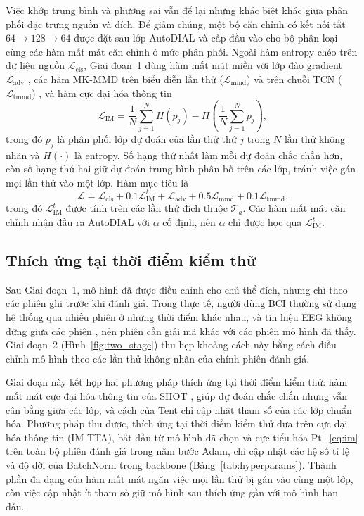 \documentclass[preprint,12pt]{elsarticle}
\begin{document}
Việc khớp trung bình và phương sai vẫn để lại những khác biệt khác giữa phân phối đặc trưng nguồn và đích. Để giảm chúng, một bộ căn chỉnh có kết nối tắt $64\!\rightarrow\!128\!\rightarrow\!64$ được đặt sau lớp AutoDIAL và cấp đầu vào cho bộ phân loại cùng các hàm mất mát căn chỉnh ở mức phân phối. Ngoài hàm entropy chéo trên dữ liệu nguồn $\mathcal{L}_{\mathrm{cls}}$, Giai đoạn~1 dùng hàm mất mát miền với lớp đảo gradient $\mathcal{L}_{\mathrm{adv}}$ \cite{ganin2016dann}, các hàm MK-MMD trên biểu diễn lần thử ($\mathcal{L}_{\mathrm{mmd}}$) và trên chuỗi TCN ($\mathcal{L}_{\mathrm{tmmd}}$) \cite{long2015dan}, và hàm cực đại hóa thông tin \cite{liang2020shot}
\begin{equation}
    \mathcal{L}_{\mathrm{IM}}
    =\frac{1}{N}\sum_{j=1}^{N} H(p_j)-H\!\left(\frac{1}{N}\sum_{j=1}^{N}p_j\right),
\label{eq:im}
\end{equation}
trong đó $p_j$ là phân phối lớp dự đoán của lần thử thứ $j$ trong $N$ lần thử không nhãn và $H(\cdot)$ là entropy. Số hạng thứ nhất làm mỗi dự đoán chắc chắn hơn, còn số hạng thứ hai giữ dự đoán trung bình phân bố trên các lớp, tránh việc gán mọi lần thử vào một lớp. Hàm mục tiêu là
\begin{equation}
    \mathcal{L}=\mathcal{L}_{\mathrm{cls}}+0.1\mathcal{L}_{\mathrm{IM}}^{t}+\mathcal{L}_{\mathrm{adv}}
    +0.5\mathcal{L}_{\mathrm{mmd}}+0.1\mathcal{L}_{\mathrm{tmmd}}.
\label{eq:total_loss}
\end{equation}
trong đó $\mathcal{L}_{\mathrm{IM}}^{t}$ được tính trên các lần thử đích thuộc $\mathcal{T}_a$. Các hàm mất mát căn chỉnh nhận đầu ra AutoDIAL với $\alpha$ cố định, nên $\alpha$ chỉ được học qua $\mathcal{L}_{\mathrm{IM}}^{t}$.

\subsection{Thích ứng tại thời điểm kiểm thử}
\label{subsec:imtta}

Sau Giai đoạn~1, mô hình đã được điều chỉnh cho chủ thể đích, nhưng chỉ theo các phiên ghi trước khi đánh giá. Trong thực tế, người dùng BCI thường sử dụng hệ thống qua nhiều phiên ở những thời điểm khác nhau, và tín hiệu EEG không dừng giữa các phiên \cite{pfurtscheller1999erd}, nên phiên cần giải mã khác với các phiên mô hình đã thấy. Giai đoạn~2 (Hình~\ref{fig:two_stage}) thu hẹp khoảng cách này bằng cách điều chỉnh mô hình theo các lần thử không nhãn của chính phiên đánh giá.

Giai đoạn này kết hợp hai phương pháp thích ứng tại thời điểm kiểm thử: hàm mất mát cực đại hóa thông tin của SHOT \cite{liang2020shot}, giúp dự đoán chắc chắn nhưng vẫn cân bằng giữa các lớp, và cách của Tent \cite{wang2021tent} chỉ cập nhật tham số của các lớp chuẩn hóa. Phương pháp thu được, thích ứng tại thời điểm kiểm thử dựa trên cực đại hóa thông tin (IM-TTA), bắt đầu từ mô hình đã chọn và cực tiểu hóa Pt.~\eqref{eq:im} trên toàn bộ phiên đánh giá trong năm bước Adam, chỉ cập nhật các hệ số tỉ lệ và độ dời của BatchNorm trong backbone (Bảng~\ref{tab:hyperparams}). Thành phần đa dạng của hàm mất mát ngăn việc mọi lần thử bị gán vào cùng một lớp, còn việc cập nhật ít tham số giữ mô hình sau thích ứng gần với mô hình ban đầu.
\end{document}
